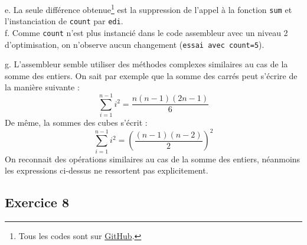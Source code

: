 \documentclass[11pt, a4 paper]{article}
\begin{document}
e. La seule différence obtenue\footnote{Tous les codes sont sur \href{https://github.com/VTrelat/ComputerArchitecture/tree/main/c}{GitHub}.} est la suppression de l'appel à la fonction \texttt{sum} et l'instanciation de \texttt{count} par \texttt{edi}.\\

f. Comme \texttt{count} n'est plus instancié dans le code assembleur avec un niveau 2 d'optimisation, on n'observe aucun changement (\texttt{essai avec \texttt{count=5}}).

g. L'assembleur semble utiliser des méthodes complexes similaires au cas de la somme des entiers. On sait par exemple que la somme des carrés peut s'écrire de la manière suivante :
\begin{equation*}
    \sum_{i=1}^{n-1} i^2 = \frac{n(n-1)(2n-1)}{6}
\end{equation*}
De même, la sommes des cubes s'écrit :
\begin{equation*}
    \sum_{i=1}^{n-1} i^2 = (\frac{(n-1)(n-2)}{2})^2
\end{equation*}
On reconnait des opérations similaires au cas de la somme des entiers, néanmoins les expressions ci-dessus ne ressortent pas explicitement.

\subsection{Exercice 8}
\end{document}
